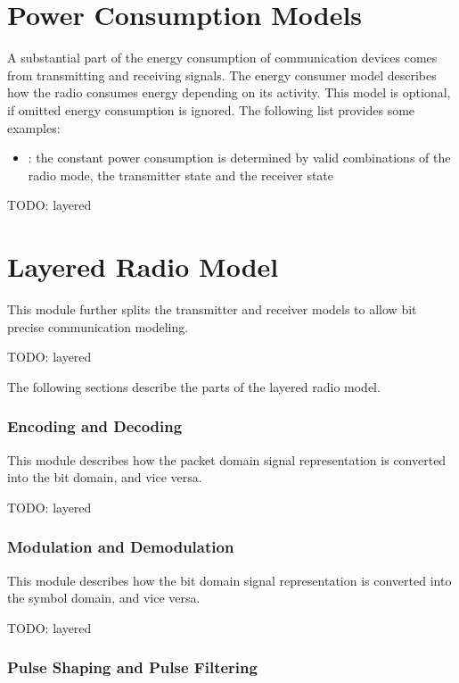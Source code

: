 \section{Power Consumption Models}

A substantial part of the energy consumption of communication devices comes from
transmitting and receiving signals. The energy consumer model describes how the
radio consumes energy depending on its activity. This model is optional, if
omitted energy consumption is ignored. The following list provides some examples:

\begin{itemize}
  \item {}: the constant power consumption is
    determined by valid combinations of the radio mode, the transmitter state
    and the receiver state
\end{itemize}

\ifdraft
TODO: layered
\section{Layered Radio Model}

This module further splits the transmitter and receiver models to allow bit
precise communication modeling.

TODO: layered

The following sections describe the parts of the layered radio model.

\subsubsection{Encoding and Decoding}

This module describes how the packet domain signal representation is converted
into the bit domain, and vice versa.

TODO: layered

\subsubsection{Modulation and Demodulation}

This module describes how the bit domain signal representation is converted into
the symbol domain, and vice versa.

TODO: layered

\subsubsection{Pulse Shaping and Pulse Filtering}

